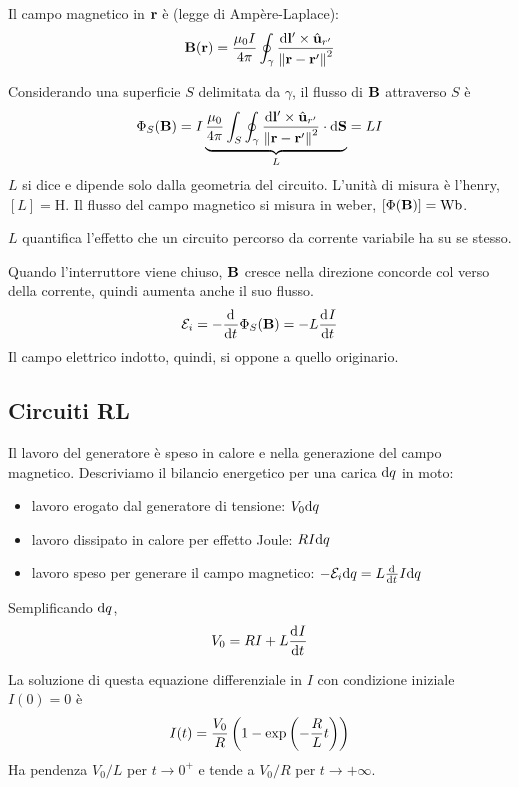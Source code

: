 Il campo magnetico in $\mathbf{r}$ è (legge di Ampère-Laplace):
\begin{equation}
    \mathbf{B}(\mathbf{r}) = \frac{\mu_0 I}{4\pi} \oint_\gamma \frac{\mathrm{d} \mathbf{l}' \times \hat{\mathbf{u}}_{r'}}{\left\lVert \mathbf{r} - \mathbf{r}' \right\rVert^2}
\end{equation}

Considerando una superficie $S$ delimitata da $\gamma$, il flusso di $\mathbf{B}$ attraverso $S$ è
\begin{equation}
    \Phi_S(\mathbf{B}) = I \underbrace{\frac{\mu_0}{4\pi} \int_S \oint_\gamma \frac{\mathrm{d} \mathbf{l}' \times \hat{\mathbf{u}}_{r'}}{\left\lVert \mathbf{r} - \mathbf{r}' \right\rVert^2} \cdot \mathrm{d} \mathbf{S}}_L = L I
\end{equation}
$L$ si dice  e dipende solo dalla geometria del circuito. L'unità di misura è l'henry, $[L] = \unit{\henry}$.
Il flusso del campo magnetico si misura in weber, $[\Phi(\B)] = \unit{\weber}$.

$L$ quantifica l'effetto che un circuito percorso da corrente variabile ha su se stesso.

Quando l'interruttore viene chiuso, $\mathbf{B}$ cresce nella direzione concorde col verso della corrente, quindi aumenta anche il suo flusso.
\begin{equation}
    \fem_i = - \der{t} \Phi_S(\B) = - L \der[I]{t}
\end{equation}
Il campo elettrico indotto, quindi, si oppone a quello originario.

\subsection{Circuiti RL}

Il lavoro del generatore è speso in calore e nella generazione del campo magnetico.
Descriviamo il bilancio energetico per una carica $\mathrm{d} q$ in moto:
\begin{itemize}
    \item lavoro erogato dal generatore di tensione: $V_0 \mathrm{d} q$
    \item lavoro dissipato in calore per effetto Joule: $R I \mathrm{d} q$
    \item lavoro speso per generare il campo magnetico: $-\fem_i \de q = L \der[I]{t} \de q$
\end{itemize}
Semplificando $\mathrm{d} q$,
\begin{equation}
    V_0 = R I + L \der[I]{t}
\end{equation}

La soluzione di questa equazione differenziale in $I$ con condizione iniziale $I(0) = 0$ è
\begin{equation}
    I(t) = \frac{V_0}{R} \left( 1 - \operatorname{exp}\left( -\frac{R}{L} t \right) \right)
\end{equation}
Ha pendenza $V_0/L$ per $t \to 0^+$ e tende a $V_0/R$ per $t \to +\infty$.

